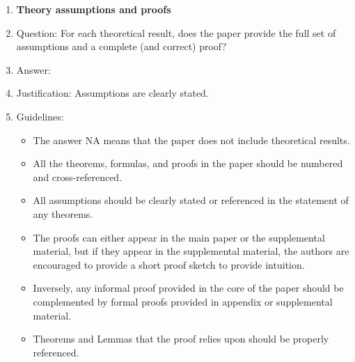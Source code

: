 \documentclass{article}
\begin{document}
\begin{enumerate}
\item {\bf Theory assumptions and proofs}
    \item[] Question: For each theoretical result, does the paper provide the full set of assumptions and a complete (and correct) proof?
    \item[] Answer: \answerYes{} %
    \item[] Justification: Assumptions are clearly stated.
    \item[] Guidelines:
    \begin{itemize}
        \item The answer NA means that the paper does not include theoretical results. 
        \item All the theorems, formulas, and proofs in the paper should be numbered and cross-referenced.
        \item All assumptions should be clearly stated or referenced in the statement of any theorems.
        \item The proofs can either appear in the main paper or the supplemental material, but if they appear in the supplemental material, the authors are encouraged to provide a short proof sketch to provide intuition. 
        \item Inversely, any informal proof provided in the core of the paper should be complemented by formal proofs provided in appendix or supplemental material.
        \item Theorems and Lemmas that the proof relies upon should be properly referenced. 
    \end{itemize}


\end{enumerate}
\end{document}
